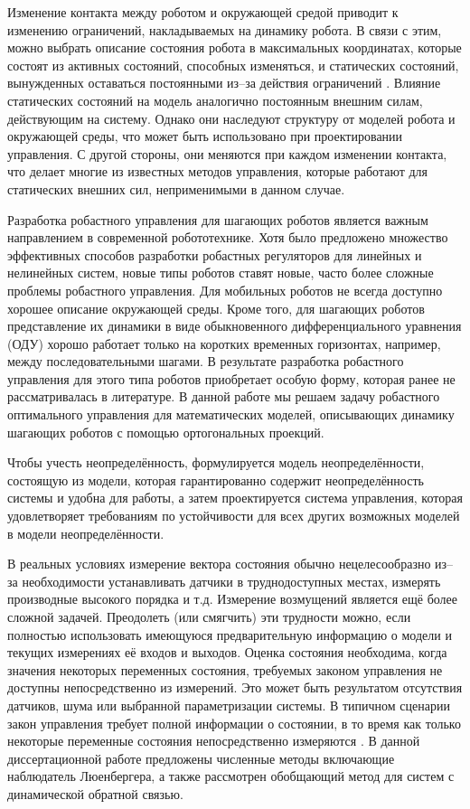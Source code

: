 Изменение контакта между роботом и окружающей средой приводит к изменению ограничений, накладываемых на динамику робота. В связи с этим, можно выбрать описание состояния робота в максимальных координатах, которые состоят из активных состояний, способных изменяться, и статических состояний, вынужденных оставаться постоянными из--за действия ограничений \cite{SAVIN2021}. Влияние статических состояний на модель аналогично постоянным внешним силам, действующим на систему. Однако они наследуют структуру от моделей робота и окружающей среды, что может быть использовано при проектировании управления. С другой стороны, они меняются при каждом изменении контакта, что делает многие из известных методов управления, которые работают для статических внешних сил, неприменимыми в данном случае.

Разработка робастного управления для шагающих роботов является важным направлением в современной робототехнике. Хотя было предложено множество эффективных способов разработки робастных регуляторов для линейных \cite{POLYAK2021, Nicolett2018} и нелинейных \cite{HAUSWIRTH2024, Celentano2018} систем, новые типы роботов ставят новые, часто более сложные проблемы робастного управления. Для мобильных роботов не всегда доступно хорошее описание окружающей среды. Кроме того, для шагающих роботов представление их динамики в виде обыкновенного дифференциального уравнения (ОДУ) хорошо работает только на коротких временных горизонтах, например, между последовательными шагами. В результате разработка робастного управления для этого типа роботов приобретает особую форму, которая ранее не рассматривалась в литературе. В данной работе мы решаем задачу робастного оптимального управления для математических моделей, описывающих динамику шагающих роботов с помощью ортогональных проекций.

Чтобы учесть неопределённость, формулируется модель неопределённости, состоящую из модели, которая гарантированно содержит неопределённость системы и удобна для работы, а затем проектируется система управления, которая удовлетворяет требованиям по устойчивости для всех других возможных моделей в модели неопределённости.

В реальных условиях измерение вектора состояния обычно нецелесообразно из--за необходимости устанавливать датчики в труднодоступных местах, измерять производные высокого порядка и т.д. Измерение возмущений является ещё более сложной задачей. Преодолеть (или смягчить) эти трудности можно, если полностью использовать имеющуюся предварительную информацию о модели и текущих измерениях её входов и выходов. Оценка состояния необходима, когда значения некоторых переменных состояния, требуемых законом управления не доступны непосредственно из измерений. Это может быть результатом отсутствия датчиков, шума или выбранной параметризации системы. В типичном сценарии закон управления требует полной информации о состоянии, в то время как только некоторые переменные состояния непосредственно измеряются \cite{Ackermann2001}. В данной диссертационной работе предложены численные методы включающие наблюдатель Люенбергера, а также рассмотрен обобщающий метод для систем с динамической обратной связью.


